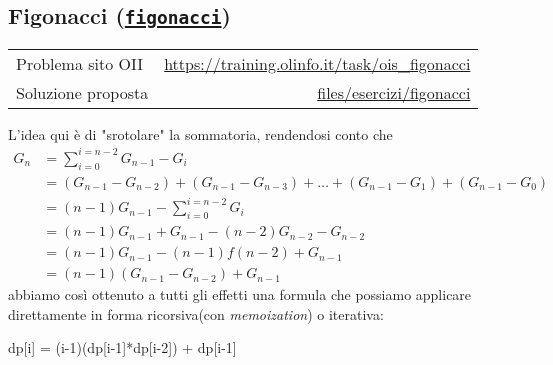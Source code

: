 \subsection{Figonacci {(\protect\texttt{\href{https://training.olinfo.it/task/ois_figonacci}{figonacci}})}}
\label{sol figonacci}
\begin{center}
	\begin{tabularx}{\textwidth}{X r}
		\toprule
		Problema sito OII  & \url{https://training.olinfo.it/task/ois_figonacci}                       \\
		Soluzione proposta & \ttfamily\href{run:./files/esercizi/figonacci/}{files/esercizi/figonacci} \\
		\bottomrule
	\end{tabularx}
\end{center}
L'idea qui è di "srotolare" la sommatoria, rendendosi conto che
\begin{align*}
	G_n & = \sum_{i=0}^{i=n-2} G_{n-1} - G_i                                                                                                       \\
	    & = \left(G_{n-1} - G_{n-2}\right) + \left(G_{n-1} - G_{n-3}\right) + \ldots + \left(G_{n-1} - G_{1}\right) + \left(G_{n-1} - G_{0}\right) \\
	    & = \left(n-1\right) G_{n-1} - \sum_{i=0}^{i = n-2} G_{i}                                                                                  \\
	    & = \left(n-1\right) G_{n-1} + G_{n-1}-\left(n-2\right)G_{n-2} - G_{n-2}                                                                   \\
	    & = \left(n-1\right) G_{n-1} - \left(n-1\right)f\left(n-2\right) + G_{n-1}                                                                 \\
	    & = \left(n-1\right)  \left(G_{n-1} - G_{n-2}\right) + G_{n-1}
\end{align*}
abbiamo così ottenuto a tutti gli effetti una formula che possiamo applicare direttamente in forma ricorsiva(con \textit{memoization}) o iterativa:
\begin{center}
	\ttfamily
	dp[i] = (i-1)(dp[i-1]*dp[i-2]) + dp[i-1]
\end{center}

